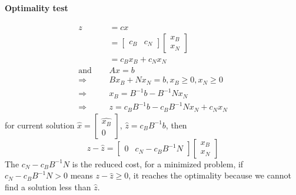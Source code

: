                 \paragraph{Optimality test}
                    \begin{align}
                        z &= cx \nonumber\\
                        & = \left[\begin{matrix}c_B & c_N\end{matrix} \right] \left [ \begin{matrix}x_B \\ x_N \end{matrix} \right] \nonumber \\
                        & = c_B x_B + c_N x_N \nonumber \\
                    \text{and } \quad& Ax=b \nonumber \\
                        \Rightarrow & Bx_B + Nx_N = b, x_B\ge 0, x_N\ge 0\nonumber \\
                        \Rightarrow & x_B = B^{-1}b-B^{-1}Nx_N\nonumber \\
                        \Rightarrow & z = c_BB^{-1}b-c_BB^{-1}Nx_N+c_Nx_N\nonumber
                    \end{align}
                    for current solution $\hat{x}=\left [\begin{matrix}\hat{x_B} \\ 0\end{matrix}\right]$, $\hat{z} = c_BB^{-1}b$, then
                    \begin{equation}
                        z - \hat{z} = \left[\begin{matrix}0 & c_N - c_BB^{-1}N \end{matrix} \right] \left[ \begin{matrix}x_B \\ x_N \end{matrix}\right] \nonumber
                    \end{equation}
                    The $c_N - c_BB^{-1}N$ is the reduced cost, for a minimized problem, if $c_N - c_BB^{-1}N > 0$ means $z - \hat{z} \ge 0$, it reaches the optimality because we cannot find a solution less than $\hat{z}$.
                                
